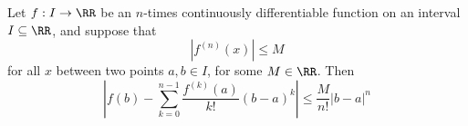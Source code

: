 

\begin{proposition}
Let $f: I\to\RR$ be an $n$-times continuously differentiable function 
on an interval $I\subseteq\RR$, and suppose that 
$$
\left| f^{(n)}(x) \right| \leq M
$$
for all $x$ between two points $a,b\in I$, for some $M\in\RR$. Then 
$$
\left| f(b) - \sum_{k=0}^{n-1} \frac{f^{(k)}(a)}{k!}(b-a)^k \right| \leq \frac{M}{n!}|b-a|^n
$$
\end{proposition}

